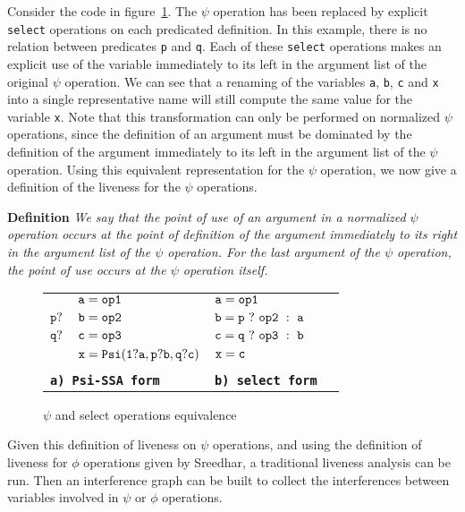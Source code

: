 Consider the code in figure~\ref{fig:psi-select}. The $\psi$ operation
has been replaced by explicit {\tt select} operations on each
predicated definition. In this example, there is no relation between
predicates {\tt p} and {\tt q}. Each of these {\tt select} operations
makes an explicit use of the variable immediately to its left in the
argument list of the original $\psi$ operation. We can see that a
renaming of the variables {\tt a}, {\tt b}, {\tt c} and {\tt x} into a
single representative name will still compute the same value for the
variable {\tt x}. Note that this transformation can only be performed
on normalized $\psi$ operations, since the definition of an argument
must be dominated by the definition of the argument immediately to its
left in the argument list of the $\psi$ operation. Using this
equivalent representation for the $\psi$ operation, we now give a
definition of the liveness for the $\psi$ operations.

{\bf Definition} {\em We say that the point of use of an argument in a
normalized $\psi$ operation occurs at the point of definition of the
argument immediately to its right in the argument list of the $\psi$
operation. For the last argument of the $\psi$ operation, the point of
use occurs at the $\psi$ operation itself.  }

\begin{figure}
\begin{center}
\footnotesize
\begin{tabular}{llll}
           & ${\tt a = op1}$ & ${\tt a = op1}$ \\
${\tt p?}$ & ${\tt b = op2}$ & ${\tt b = p\ ?\ op2\ :\ a}$ \\
${\tt q?}$ & ${\tt c = op3}$ & ${\tt c = q\ ?\ op3\ :\ b}$ \\
           & ${\tt x = Psi(1?a,p?b,q?c)}$ & ${\tt x = c}$ \\
\\
\multicolumn{2}{l}{\tt {\bf a) Psi-SSA form}} & {\tt {\bf b) select form}}
\end{tabular}
\caption{$\psi$ and select operations equivalence}
\label{fig:psi-select}
\end{center}
\end{figure}

Given this definition of liveness on $\psi$ operations, and using the
definition of liveness for $\phi$ operations given by Sreedhar, a
traditional liveness analysis can be run. Then an interference graph
can be built to collect the interferences between variables involved
in $\psi$ or $\phi$ operations.

